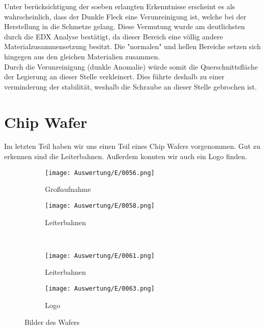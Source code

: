 Unter berücksichtigung der soeben erlangten Erkenntnisse erscheint es als wahrscheinlich, dass der Dunkle Fleck eine Verunreinigung ist, welche bei der Herstellung in die Schmetze gelang. Diese Vermutung wurde am deutlichsten durch die EDX Analyse bestätigt, da dieser Bereich eine völlig andere Materialzusammensetzung besitzt. Die "normalen" und hellen Bereiche setzen sich hingegen aus den gleichen Materialien zusammen. \\

Durch die Verunreinigung (dunkle Anomalie) würde somit die Querschnittsfläche der Legierung an dieser Stelle verkleinert. Dies führte deshalb zu einer verminderung der stabilität, weshalb die Schraube an dieser Stelle gebrochen ist.

\newpage
\section{Chip Wafer}

Im letzten Teil haben wir uns einen Teil eines Chip Wafers vorgenommen. Gut zu erkennen sind die Leiterbahnen. Außerdem konnten wir auch ein Logo finden.

\begin{figure}[h]
    \centering
    
    \begin{subfigure}[b]{0.45\textwidth}
        \centering
        \texttt{[image: Auswertung/E/0056.png]}
        \caption{Großaufnahme}
    \end{subfigure}
    \hfill
    \begin{subfigure}[b]{0.45\textwidth}
        \centering
        \texttt{[image: Auswertung/E/0058.png]}
        \caption{Leiterbahnen}
    \end{subfigure}
    \\
    \begin{subfigure}[b]{0.45\textwidth}
        \centering
        \texttt{[image: Auswertung/E/0061.png]}
        \caption{Leiterbahnen}
    \end{subfigure}
    \hfill
    \begin{subfigure}[b]{0.45\textwidth}
        \centering
        \texttt{[image: Auswertung/E/0063.png]}
        \caption{Logo}
    \end{subfigure}
    \caption{Bilder des Wafers}
\end{figure}